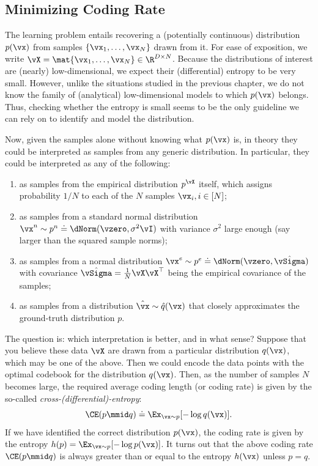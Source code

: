 \documentclass[../../book-main.tex]{subfiles}
\begin{document}
\subsection{Minimizing Coding Rate}\label{sub:min_entropy}
The learning problem entails recovering a (potentially continuous)
distribution \(p(\vx)\) from samples \(\{\vx_{1}, \dots, \vx_{N}\}\)
drawn from it. For ease of exposition, we write \(\vX = \mat{\vx_{1},
\dots, \vx_{N}} \in \R^{D \times N}\). Because the distributions of
interest are (nearly) low-dimensional, we expect their (differential)
entropy to be very small. However, unlike the situations studied in
the previous chapter, we do not know the family of (analytical)
low-dimensional models to which \(p(\vx)\) belongs. Thus, checking
whether the entropy is small seems to be the only guideline we can
rely on to identify and model the distribution.

Now, given the samples alone without knowing what \(p(\vx)\) is, in
theory they could be interpreted as samples from any generic
distribution. In particular, they could be interpreted as any of the following:
\begin{enumerate}
    \item as samples from the empirical distribution \(p^{\vX}\)
        itself, which assigns probability \(1/N\) to each of the
        \(N\) samples \(\vx_{i}, i \in [N]\);
    \item as samples from a standard normal distribution \(\vx^{n}
        \sim p^{n} \doteq \dNorm(\vzero, \sigma^{2} \vI)\) with
        variance \(\sigma^{2}\) large enough (say larger than the
        squared sample norms);
    \item as samples from a normal distribution \(\vx^{e} \sim p^{e}
        \doteq \dNorm(\vzero, \hat{\vSigma})\) with covariance
        \(\hat{\vSigma} = \frac{1}{N} \vX \vX^{\top}\) being the
        empirical covariance of the samples;
    \item as samples from a distribution \(\hat{\vx} \sim
        \hat{q}(\vx)\) that closely approximates the ground-truth
        distribution \(p\).
\end{enumerate}
The question is: which interpretation is better, and in what sense? Suppose
that you believe these data \(\vX\) are drawn from a particular
distribution \(q(\vx)\), which may be one of the above. Then we could
encode the data points with the optimal codebook for the distribution
\(q(\vx)\). Then, as the number of samples \(N\) becomes large, the
required average coding length (or coding rate) is given by the
so-called \textit{cross-(differential)-entropy}:
\begin{equation}
    \CE(p \mmid q) \doteq \Ex_{\vx \sim p}[-\log q(\vx)].
\end{equation}
If we have identified
the correct distribution \(p(\vx)\), the coding rate is given by the
entropy \(h(p) = \Ex_{\vx \sim p}[-\log p(\vx)]\). It turns out
that the above coding rate \(\CE(p \mmid q)\) is always greater than
or equal to the entropy \(h(\vx)\) unless \(p = q\).
\end{document}
